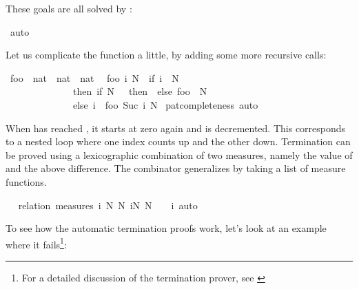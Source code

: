 \begin{isabellebody}
\begin{isamarkuptxt}
  These goals are all solved by :%
\end{isamarkuptxt}%
\isamarkuptrue%
\isamarkupfalse%
\ auto\isanewline
{}\isamarkupfalse%
%
\endisatagproof
{\isafoldproof}%
%
\isadelimproof
%
\endisadelimproof
%
\begin{isamarkuptext}%
Let us complicate the function a little, by adding some more
  recursive calls:%
\end{isamarkuptext}%
\isamarkuptrue%
\isamarkupfalse%
\ foo\ {\isacharcolon}{\isacharcolon}\ {\isachardoublequoteopen}nat\ {\isasymRightarrow}\ nat\ {\isasymRightarrow}\ nat{\isachardoublequoteclose}\isanewline
{}\isanewline
\ \ {\isachardoublequoteopen}foo\ i\ N\ {\isacharequal}\ {\isacharparenleft}if\ i\ {\isachargreater}\ N\ \isanewline
\ \ \ \ \ \ \ \ \ \ \ \ \ \ then\ {\isacharparenleft}if\ N\ {\isacharequal}\ {}\ then\ {}\ else\ foo\ {}\ {\isacharparenleft}N\ {\isacharminus}\ {}{\isacharparenright}{\isacharparenright}\isanewline
\ \ \ \ \ \ \ \ \ \ \ \ \ \ else\ i\ {\isacharplus}\ foo\ {\isacharparenleft}Suc\ i{\isacharparenright}\ N{\isacharparenright}{\isachardoublequoteclose}\isanewline
%
\isadelimproof
%
\endisadelimproof
%
\isatagproof
{}\isamarkupfalse%
\ pat{\isacharunderscore}completeness\ auto%
\endisatagproof
{\isafoldproof}%
%
\isadelimproof
%
\endisadelimproof
%
\begin{isamarkuptext}%
When  has reached , it starts at zero again
  and  is decremented.
  This corresponds to a nested
  loop where one index counts up and the other down. Termination can
  be proved using a lexicographic combination of two measures, namely
  the value of  and the above difference. The  combinator generalizes  by taking a
  list of measure functions.%
\end{isamarkuptext}%
\isamarkuptrue%
\isamarkupfalse%
\ \isanewline
%
\isadelimproof
%
\endisadelimproof
%
\isatagproof
{}\isamarkupfalse%
\ {\isacharparenleft}relation\ {\isachardoublequoteopen}measures\ {\isacharbrackleft}{\isasymlambda}{\isacharparenleft}i{\isacharcomma}\ N{\isacharparenright}{\isachardot}\ N{\isacharcomma}\ {\isasymlambda}{\isacharparenleft}i{\isacharcomma}N{\isacharparenright}{\isachardot}\ N\ {\isacharplus}\ {}\ {\isacharminus}\ i{\isacharbrackright}{\isachardoublequoteclose}{\isacharparenright}\ auto%
\endisatagproof
{\isafoldproof}%
%
\isadelimproof
%
\endisadelimproof
%
\isamarkuptrue%
%
\begin{isamarkuptext}%
To see how the automatic termination proofs work, let's look at an
  example where it fails\footnote{For a detailed discussion of the
  termination prover, see \cite{bulwahnKN07}}:


\end{isamarkuptext}
\end{isabellebody}
